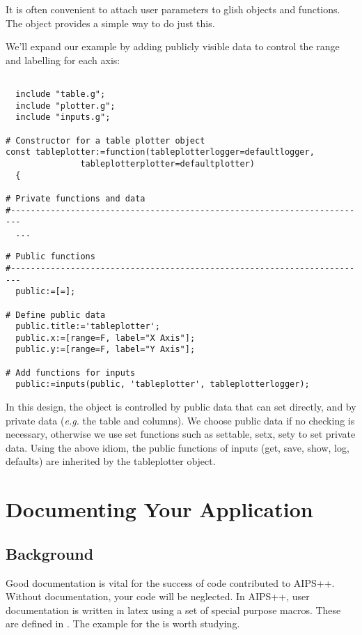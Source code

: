 It is often convenient to attach user parameters to glish
objects and functions. The  object 
provides a simple way to do just this. 

We'll expand our example by adding publicly visible data to
control the range and labelling for each axis:

\begin{verbatim}
  
  include "table.g";
  include "plotter.g";
  include "inputs.g";
  
# Constructor for a table plotter object
const tableplotter:=function(tableplotterlogger=defaultlogger,
		       tableplotterplotter=defaultplotter) 
  {
    
# Private functions and data
#------------------------------------------------------------------------
  ...

# Public functions
#------------------------------------------------------------------------
  public:=[=];

# Define public data
  public.title:='tableplotter';
  public.x:=[range=F, label="X Axis"];
  public.y:=[range=F, label="Y Axis"];
  
# Add functions for inputs
  public:=inputs(public, 'tableplotter', tableplotterlogger);
\end{verbatim}

In this design, the object is controlled by public data that can set
directly, and by private data ({\em e.g.} the table and columns).  We
choose public data if no checking is necessary, otherwise we use set
functions such as settable, setx, sety to set private data. Using the
above idiom, the public functions of inputs (get, save, show, log,
defaults) are inherited by the tableplotter object.

\section{Documenting Your Application}
\label{sec:documenting}
\subsection{Background}

Good documentation is vital for the success of code contributed to
AIPS++. Without documentation, your code will be neglected.  In
AIPS++, user documentation is written in latex using a set of special
purpose macros. These are defined in .
The example for the  is worth studying.

